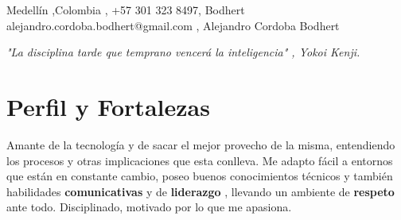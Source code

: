 \documentclass[
    changecolor={111, 156, 45}, 
]{cv-roald}
\begin{document}
\pagestyle{empty} %

 {%
  \faMapMarker \FAspace Medellín \sep Colombia \sep%
  \faMobile \FAspace +57 301 323 8497\sep%
  \faGithub Bodhert \FAspace {}
 }
 {%
  \faEnvelope \FAspace alejandro.cordoba.bodhert@gmail.com \sep%
  \faLinkedinSquare  \FAspace Alejandro Cordoba Bodhert \FAspace {}
 }



\textit{"La disciplina tarde que temprano vencerá la inteligencia" , \textit{Yokoi Kenji}.}

\section{Perfil y Fortalezas}

 Amante de la tecnología y de sacar el mejor provecho de la misma, entendiendo los procesos y otras implicaciones que esta conlleva. Me adapto fácil a entornos que están en constante cambio, poseo buenos conocimientos técnicos y también habilidades \textbf{comunicativas} y de \textbf{liderazgo} , llevando un ambiente de \textbf{respeto} ante todo. Disciplinado, motivado por lo que me apasiona.
\end{document}

